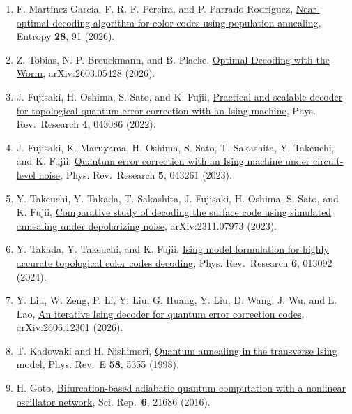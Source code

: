 \documentclass[
  10pt,
]{article}
\begin{document}
\begin{enumerate}
  \textbf{89}, 022326 (2014).
\item
  \hypertarget{ref:11}{} F. Martínez-García, F. R. F. Pereira, and P. Parrado-Rodríguez,
  \href{https://doi.org/10.3390/e28010091}{Near-optimal decoding
  algorithm for color codes using population annealing}, Entropy
  \textbf{28}, 91 (2026).
\item
  \hypertarget{ref:12}{} Z. Tobias, N. P. Breuckmann, and B. Placke,
  \href{https://arxiv.org/abs/2603.05428}{Optimal Decoding with the
  Worm}, arXiv:2603.05428 (2026).
\item
  \hypertarget{ref:13}{} J. Fujisaki, H. Oshima, S. Sato, and K. Fujii,
  \href{https://doi.org/10.1103/PhysRevResearch.4.043086}{Practical and
  scalable decoder for topological quantum error correction with an
  Ising machine}, Phys. Rev.~Research \textbf{4}, 043086 (2022).
\item
  \hypertarget{ref:14}{} J. Fujisaki, K. Maruyama, H. Oshima, S. Sato, T. Sakashita, Y.
  Takeuchi, and K. Fujii,
  \href{https://doi.org/10.1103/PhysRevResearch.5.043261}{Quantum error
  correction with an Ising machine under circuit-level noise}, Phys.
  Rev.~Research \textbf{5}, 043261 (2023).
\item
  \hypertarget{ref:15}{} Y. Takeuchi, Y. Takada, T. Sakashita, J. Fujisaki, H. Oshima, S. Sato,
  and K. Fujii, \href{https://arxiv.org/abs/2311.07973}{Comparative
  study of decoding the surface code using simulated annealing under
  depolarizing noise}, arXiv:2311.07973 (2023).
\item
  \hypertarget{ref:16}{} Y. Takada, Y. Takeuchi, and K. Fujii,
  \href{https://doi.org/10.1103/PhysRevResearch.6.013092}{Ising model
  formulation for highly accurate topological color codes decoding},
  Phys. Rev.~Research \textbf{6}, 013092 (2024).
\item
  \hypertarget{ref:17}{} Y. Liu, W. Zeng, P. Li, Y. Liu, G. Huang, Y. Liu, D. Wang, J. Wu, and
  L. Lao, \href{https://arxiv.org/abs/2606.12301}{An iterative Ising
  decoder for quantum error correction codes}, arXiv:2606.12301 (2026).
\item
  \hypertarget{ref:18}{} T. Kadowaki and H. Nishimori,
  \href{https://doi.org/10.1103/PhysRevE.58.5355}{Quantum annealing in
  the transverse Ising model}, Phys. Rev.~E \textbf{58}, 5355 (1998).
\item
  \hypertarget{ref:19}{} H. Goto, \href{https://doi.org/10.1038/srep21686}{Bifurcation-based
  adiabatic quantum computation with a nonlinear oscillator network},
  Sci. Rep.~\textbf{6}, 21686 (2016).

\end{enumerate}
\end{document}
